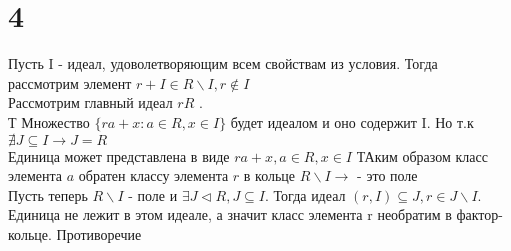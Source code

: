 	 \section*{4}
	 Пусть I - идеал, удоволетворяющим всем свойствам из условия. Тогда рассмотрим элемент $r+I\in R\backslash I, r\notin I$\\
	 Рассмотрим главный идеал $rR$ .\\ Т Множество $\{ra+x\colon a\in R, x\in I\}$ будет идеалом и оно содержит I. Но т.к $\nexists J\subseteq I \to J = R $\\
	 Единица может представлена в виде $ra+x, a\in R, x\in I$
	 ТАким образом класс элемента $a$ обратен классу элемента $r$ в кольце $R\backslash I \to $ - это поле \\
	 Пусть теперь $R\backslash I  $ - поле и $\exists  J\triangleleft R, J\subseteq I$.
	 Тогда идеал $(r,I )\subseteq J,  r\in J\backslash I$. Единица не лежит в этом идеале, а значит класс элемента r необратим в фактор-кольце. Противоречие
	
	 